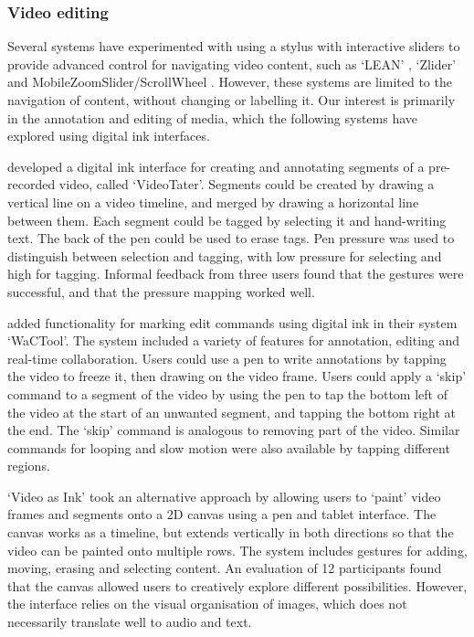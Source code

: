 \subsubsection{Video editing}
Several systems have experimented with using a stylus with interactive sliders to provide advanced control for
navigating video content, such as `LEAN' \citep{Ramos2003}, `Zlider' \citep{Ramos2005} and MobileZoomSlider/ScrollWheel
\citep{Huerst2008}. However, these systems are limited to the navigation of content, without changing or labelling it.
Our interest is primarily in the annotation and editing of media, which the following systems have explored using
digital ink interfaces.

\citet{Diakopoulos2006} developed a digital ink interface for creating and annotating segments of a pre-recorded video,
called `VideoTater'. Segments could be created by drawing a vertical line on a video timeline, and merged by drawing a
horizontal line between them. Each segment could be tagged by selecting it and hand-writing text. The back of
the pen could be used to erase tags. Pen pressure was used to distinguish between selection and tagging, with low
pressure for selecting and high for tagging. Informal feedback from three users found that the gestures were
successful, and that the pressure mapping worked well.

\citet{Cattelan2008} added functionality for marking edit commands using digital ink in their system `WaCTool'. The
system included a variety of features for annotation, editing and real-time collaboration. Users could use a pen to
write annotations by tapping the video to freeze it, then drawing on the video frame.  Users could apply a `skip'
command to a segment of the video by using the pen to tap the bottom left of the video at the start of an unwanted
segment, and tapping the bottom right at the end. The `skip' command is analogous to removing part of the video.
Similar commands for looping and slow motion were also available by tapping different regions.

`Video as Ink' \citep{Cabral2016} took an alternative approach by allowing users to `paint' video frames and segments
onto a 2D canvas using a pen and tablet interface. The canvas works as a timeline, but extends vertically in both
directions so that the video can be painted onto multiple rows. The system includes gestures for adding, moving,
erasing and selecting content. An evaluation of 12 participants found that the canvas allowed users to creatively
explore different possibilities. However, the interface relies on the visual organisation of images, which does not
necessarily translate well to audio and text.

